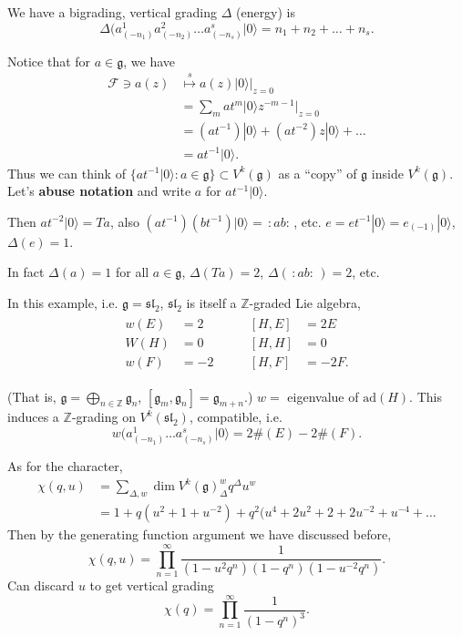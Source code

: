 We have a bigrading, vertical grading $\Delta$ (energy) is
$$
\Delta(a^1_{(-n_1)}a^2_{(-n_2)}\ldots a^s_{(-n_s)}|0\rangle
=n_1+n_2+\ldots+n_s.
$$

Notice that for $a \in \mathfrak{g}$, we have
\begin{align*}
\mathcal{F}\ni a(z)&\overset{s}{\mapsto }
a(z)|0\rangle |_{z=0}\\
&=\sum_{m}at^m |0\rangle z^{-m-1}\Big|_{z=0}\\
&=(at^{-1})|0\rangle+(at^{-2})z|0\rangle+\ldots\\
&=at^{-1} |0\rangle.
\end{align*}
Thus we can think of
$\{a t^{-1} |0\rangle:a \in \mathfrak{g}\}\subset V^k(\mathfrak{g})$ 
as a ``copy'' of $\mathfrak{g}$ inside $V^k(\mathfrak{g})$.
Let's {\bf abuse notation} and write $a$ for $at^{-1}|0\rangle$.

Then $at^{-2}|0\rangle=Ta$, also
$(at^{-1})(bt^{-1})|0\rangle=\,:\!ab\!:\,$, etc.
$e=et^{-1}|0\rangle=e_{(-1)}|0\rangle$, $\Delta(e)=1$.

In fact $\Delta(a)=1$ for all $a \in \mathfrak{g}$,
$\Delta(Ta)=2$,
$\Delta(\,:\!ab\!:\,)=2$, etc.

In this example, i.e. $\mathfrak{g}=\mathfrak{sl}_2$,
$\mathfrak{sl}_2$ is itself a $\mathbb{Z}$-graded Lie algebra,
\begin{align*}
\begin{aligned}
w(E)&=2\\
W(H)&=0\\
w(F)&=-2
\end{aligned}
\qquad 
\begin{aligned}
[H,E]&=2E\\
[H,H]&=0\\
[H,F]&=-2F.
\end{aligned}
\end{align*}

(That is, $\mathfrak{g}=\bigoplus_{n \in \mathbb{Z}}\mathfrak{g}_n$,
$[\mathfrak{g}_m,\mathfrak{g}_n]=\mathfrak{g}_{m+n}$.)
$w=$ eigenvalue of $\text{ad}(H)$.
This induces a $\mathbb{Z}$-grading on $V^k(\mathfrak{sl}_2)$,
compatible, i.e.
$$
w(a^1_{(-n_1)}\ldots a^s_{(-n_s)}|0\rangle=
2\#(E)-2\#(F).
$$

\medskip\noindent
As for the character,
\begin{align*}
\chi(q,u)&=\sum_{\Delta,w}\dim V^k(\mathfrak{g})_\Delta^w q^\Delta u^w\\
&=1+q(u^2+1+u^{-2})
+q^2(u^4+2u^2+2+2u^{-2}+u^{-4}+\ldots
\end{align*}
Then by the generating function argument we have discussed
before,
$$
\chi(q,u)=\prod_{n=1}^\infty \frac{1}
{(1-u^2q^n)(1-q^n)(1-u^{-2}q^n)}.
$$
Can discard $u$ to get vertical grading
$$
\chi(q)=\prod_{n=1}^\infty \frac{1}{(1-q^n)^3}.
$$

